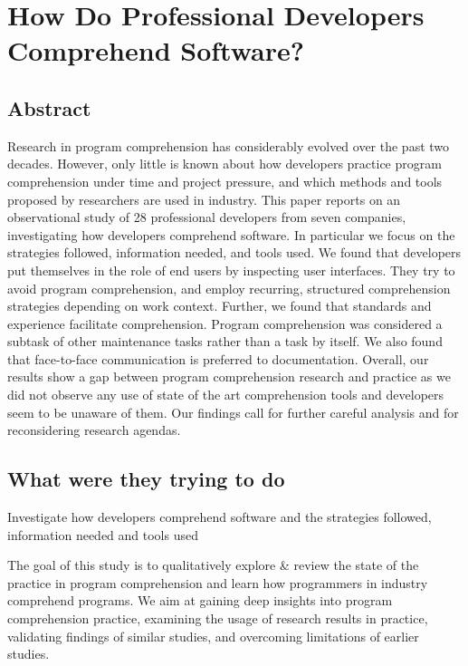 \section{How Do Professional Developers Comprehend Software?}

\subsection{Abstract}

Research in program comprehension has considerably evolved over the past two decades. However, only little is known about how developers practice program comprehension under time and project pressure, and which methods and tools proposed by researchers are used in industry. This paper reports on an observational study of 28 professional developers from seven companies, investigating how developers comprehend software. In particular we focus on the strategies followed, information needed, and tools used. We found that developers put themselves in the role of end users by inspecting user interfaces. They try to avoid program comprehension, and employ recurring, structured comprehension strategies depending on work context. Further, we found that standards and experience facilitate comprehension. Program comprehension was considered a subtask of other maintenance tasks rather than a task by itself. We also found that face-to-face communication is preferred to documentation. Overall, our results show a gap between program comprehension research and practice as we did not observe any use of state of the art comprehension tools and developers seem to be unaware of them. Our findings call for further careful analysis and for reconsidering research agendas.

\subsection{What were they trying to do}

Investigate how developers comprehend software and the strategies followed, information needed and tools used

The goal of this study is to qualitatively explore \& review the state of the practice
in program comprehension and learn how programmers in
industry comprehend programs. We aim at gaining deep
insights into program comprehension practice, examining the
usage of research results in practice, validating findings of
similar studies, and overcoming limitations of earlier studies.

